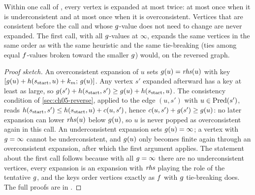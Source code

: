 \begin{theorem}
\label{thm:ch05-expansions}
Within one call of \DslComputeShortestPath, every vertex is expanded at most twice:
at most once when it is underconsistent and at most once when it is overconsistent.
Vertices that are consistent before the call and whose $g$-value does not need to
change are never expanded. The first call, with all $g$-values at $\infty$, expands
the same vertices in the same order as \astar with the same heuristic and the same
tie-breaking (ties among equal $f$-values broken toward the smaller $g$)
would, on the reversed graph.
\end{theorem}
\begin{proof}[Proof sketch]
An overconsistent expansion of $u$ sets $g(u)=\mathit{rhs}(u)$ with key
$[g(u)+h(s_{\mathrm{start}},u)+k_m;\,g(u)]$. Any vertex $s'$ expanded
afterward has a key at least as large, so $g(s') + h(s_{\mathrm{start}},s') \ge
g(u) + h(s_{\mathrm{start}},u)$. The consistency condition of
\cref{sec:ch05-reverse}, applied to the edge $(u,s')$ with $u \in \operatorname{Pred}(s')$, reads
$h(s_{\mathrm{start}},s') \le h(s_{\mathrm{start}},u) + c(u,s')$, hence
$c(u,s') + g(s') \ge g(u)$: no later expansion can lower
$\mathit{rhs}(u)$ below $g(u)$, so $u$ is never popped as overconsistent again in this
call. An underconsistent expansion sets $g(u)=\infty$; a vertex with
$g=\infty$ cannot be underconsistent, and $g(u)$ only becomes finite again
through an overconsistent expansion, after which the first argument applies. The
statement about the first call follows because with all $g=\infty$ there are no
underconsistent vertices, every expansion is an \astar expansion with $\mathit{rhs}$ playing the
role of the tentative $g$, and the keys order vertices exactly as $f$ with
$g$ tie-breaking does. The full proofs are in \textcite{koenig2004lpa}.
\end{proof}

